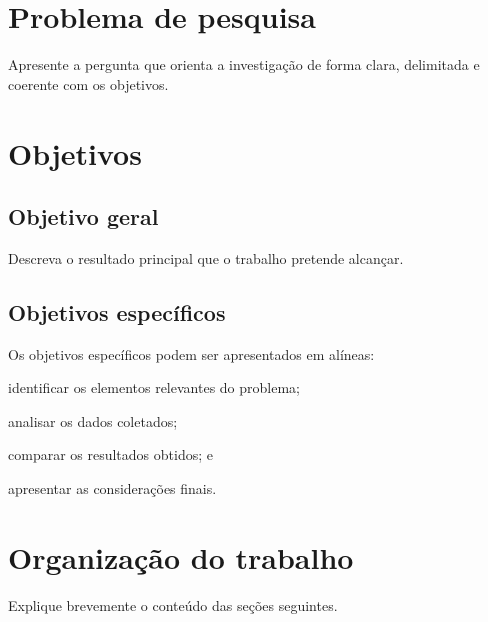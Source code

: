 \section{Problema de pesquisa}

Apresente a pergunta que orienta a investigação de forma clara, delimitada e coerente com os objetivos.

\section{Objetivos}

\subsection{Objetivo geral}

Descreva o resultado principal que o trabalho pretende alcançar.

\subsection{Objetivos específicos}

Os objetivos específicos podem ser apresentados em alíneas:

\begin{alineas}
  \item identificar os elementos relevantes do problema;
  \item analisar os dados coletados;
  \item comparar os resultados obtidos; e
  \item apresentar as considerações finais.
\end{alineas}

\section{Organização do trabalho}

Explique brevemente o conteúdo das seções seguintes.
